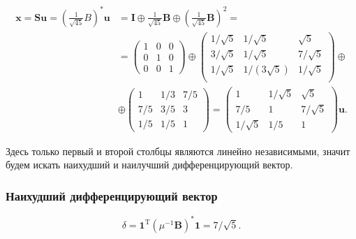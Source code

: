 \documentclass[specialist,
	substylefile = spbu.rtx,
	subf,href,colorlinks=true, 12pt]{disser}
\begin{document}
\begin{align*}
	\mathbf{x} = \mathbf{S}\mathbf{u} = \left(\frac{1}{\sqrt{45}}B\right)^*\mathbf{u} & =
	\mathbf{I} \oplus \frac{1}{\sqrt{45}} \mathbf{B} \oplus (\frac{1}{\sqrt{45}} \mathbf{B})^2 = \\
	&=\begin{pmatrix}1& 0& 0\\0& 1& 0\\0& 0& 1\end{pmatrix}
	\oplus
	\begin{pmatrix}
		1/\sqrt{5} & 1/\sqrt{5}     & \sqrt{5}   \\
		3/\sqrt{5} & 1/\sqrt{5}     & 7/\sqrt{5} \\
		1/\sqrt{5} & 1/(3 \sqrt{5}) & 1/\sqrt{5} \\
	\end{pmatrix}   \oplus                                      \\
	                                                           & \oplus
	\begin{pmatrix}1& 1/3& 7/5\\7/5& 3/5& 3\\1/5& 1/5& 1\end{pmatrix} =
	\begin{pmatrix} 1&1/\sqrt{5}&\sqrt{5}\\ 7/5&1&7/\sqrt{5}\\ 1/\sqrt{5}&1/5&1 \end{pmatrix}\mathbf{u}.
\end{align*}

Здесь только первый и второй столбцы являются линейно независимыми, значит будем искать наихудший и наилучший дифференцирующий вектор.

\subsubsection{Наихудший дифференцирующий вектор}
\[
	\delta = \mathbf{1}^\mathrm{T}(\mu^{-1}\mathbf{B})^*\mathbf{1} = 7/\sqrt{5}.
\]
\end{document}
